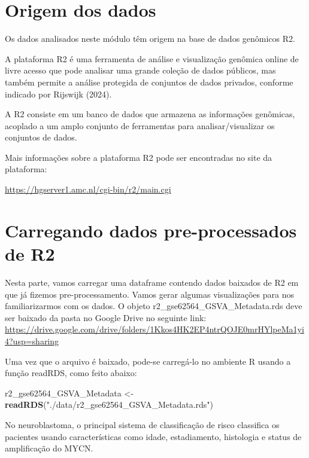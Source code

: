\documentclass[
]{book}
\newenvironment{Shaded}{\begin{snugshade}}{\end{snugshade}}
\newcommand{\FunctionTok}[1]{\textcolor[rgb]{0.13,0.29,0.53}{\textbf{#1}}}
\newcommand{\NormalTok}[1]{#1}
\newcommand{\OtherTok}[1]{\textcolor[rgb]{0.56,0.35,0.01}{#1}}
\newcommand{\StringTok}[1]{\textcolor[rgb]{0.31,0.60,0.02}{#1}}
\begin{document}
\section{Origem dos dados}\label{origem-dos-dados}

Os dados analisados neste módulo têm origem na base de dados genômicos R2.

A plataforma R2 é uma ferramenta de análise e visualização genômica online de livre acesso que pode analisar uma grande coleção de dados públicos, mas também permite a análise protegida de conjuntos de dados privados, conforme indicado por Rijswijk (2024).

A R2 consiste em um banco de dados que armazena as informações genômicas, acoplado a um amplo conjunto de ferramentas para analisar/visualizar os conjuntos de dados.

Mais informações sobre a plataforma R2 pode ser encontradas no site da plataforma:

\url{https://hgserver1.amc.nl/cgi-bin/r2/main.cgi}

\hfill\break

\section{Carregando dados pre-processados de R2}\label{carregando-dados-pre-processados-de-r2}

\hfill\break

Nesta parte, vamos carregar uma dataframe contendo dados baixados de R2 em que já fizemos pre-processamento. Vamos gerar algumas visualizações para nos familiarizarmos com os dados. O objeto r2\_gse62564\_GSVA\_Metadata.rds deve ser baixado da pasta no Google Drive no seguinte link: \url{https://drive.google.com/drive/folders/1Kkos4HK2EP4ntrQOJE0mrHYlpeMa1yi4?usp=sharing}

Uma vez que o arquivo é baixado, pode-se carregá-lo no ambiente R usando a função readRDS, como feito abaixo:

\begin{Shaded}
\begin{Highlighting}[]
\NormalTok{r2\_gse62564\_GSVA\_Metadata }\OtherTok{\textless{}{-}} \FunctionTok{readRDS}\NormalTok{(}\StringTok{"./data/r2\_gse62564\_GSVA\_Metadata.rds"}\NormalTok{)}
\end{Highlighting}
\end{Shaded}

No neuroblastoma, o principal sistema de classificação de risco classifica os pacientes usando características como idade, estadiamento, histologia e status de amplificação do MYCN.
\end{document}
